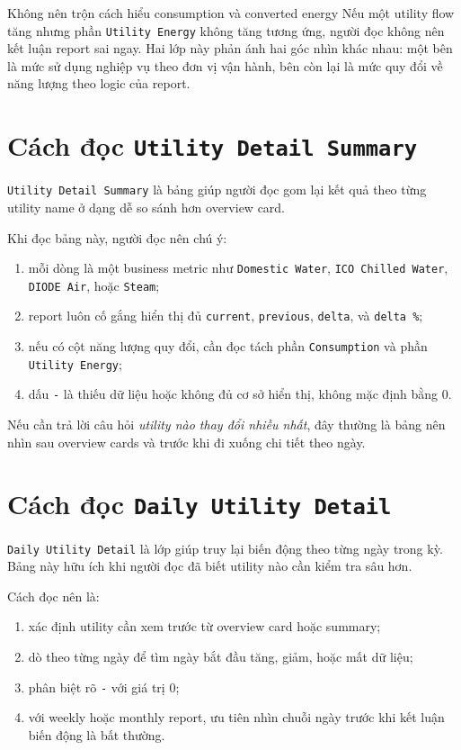 \begin{ReaderNote}{Không nên trộn cách hiểu consumption và converted energy}
Nếu một utility flow tăng nhưng phần \texttt{Utility Energy} không tăng tương ứng, người đọc không nên kết luận report sai ngay. Hai lớp này phản ánh hai góc nhìn khác nhau: một bên là mức sử dụng nghiệp vụ theo đơn vị vận hành, bên còn lại là mức quy đổi về năng lượng theo logic của report.
\end{ReaderNote}

\section{Cách đọc \texttt{Utility Detail Summary}}

\texttt{Utility Detail Summary} là bảng giúp người đọc gom lại kết quả theo từng utility name ở dạng dễ so sánh hơn overview card.

Khi đọc bảng này, người đọc nên chú ý:

\begin{enumerate}[label=-]
\item mỗi dòng là một business metric như \texttt{Domestic Water}, \texttt{ICO Chilled Water}, \texttt{DIODE Air}, hoặc \texttt{Steam};
\item report luôn cố gắng hiển thị đủ \texttt{current}, \texttt{previous}, \texttt{delta}, và \texttt{delta \%};
\item nếu có cột năng lượng quy đổi, cần đọc tách phần \texttt{Consumption} và phần \texttt{Utility Energy};
\item dấu \texttt{-} là thiếu dữ liệu hoặc không đủ cơ sở hiển thị, không mặc định bằng 0.
\end{enumerate}

Nếu cần trả lời câu hỏi \textit{utility nào thay đổi nhiều nhất}, đây thường là bảng nên nhìn sau overview cards và trước khi đi xuống chi tiết theo ngày.

\section{Cách đọc \texttt{Daily Utility Detail}}

\texttt{Daily Utility Detail} là lớp giúp truy lại biến động theo từng ngày trong kỳ. Bảng này hữu ích khi người đọc đã biết utility nào cần kiểm tra sâu hơn.

Cách đọc nên là:

\begin{enumerate}[label=-]
\item xác định utility cần xem trước từ overview card hoặc summary;
\item dò theo từng ngày để tìm ngày bắt đầu tăng, giảm, hoặc mất dữ liệu;
\item phân biệt rõ \texttt{-} với giá trị 0;
\item với weekly hoặc monthly report, ưu tiên nhìn chuỗi ngày trước khi kết luận biến động là bất thường.
\end{enumerate}

